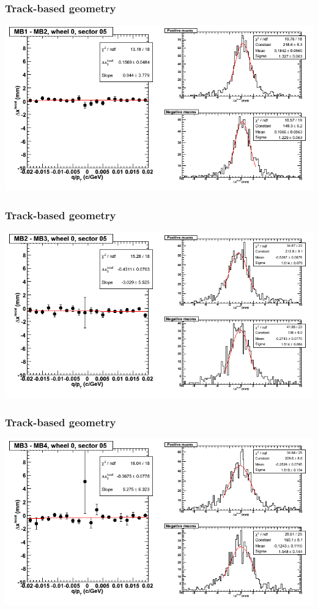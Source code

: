 \documentclass[compress]{beamer}
\begin{document}
\begin{frame}
\frametitle{Track-based geometry}
\includegraphics[width=\linewidth]{NOV4_segdiffs/dt13_resid_C_05_12.png}
\end{frame}

\begin{frame}
\frametitle{Track-based geometry}
\includegraphics[width=\linewidth]{NOV4_segdiffs/dt13_resid_C_05_23.png}
\end{frame}

\begin{frame}
\frametitle{Track-based geometry}
\includegraphics[width=\linewidth]{NOV4_segdiffs/dt13_resid_C_05_34.png}
\end{frame}
\end{document}
